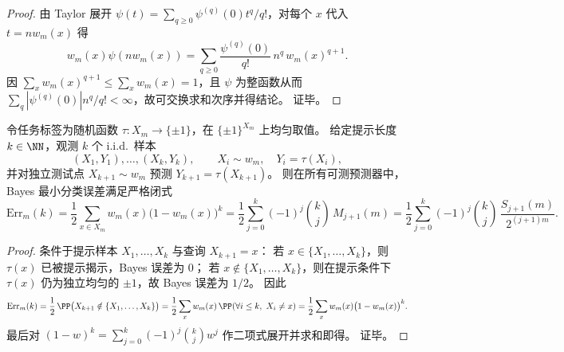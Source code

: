 \begin{proof}
由 Taylor 展开 \(\psi(t)=\sum_{q\ge 0}\psi^{(q)}(0)t^q/q!\)，对每个 \(x\) 代入 \(t=nw_m(x)\) 得
\[
w_m(x)\psi(nw_m(x))=\sum_{q\ge 0}\frac{\psi^{(q)}(0)}{q!}\,n^q\,w_m(x)^{q+1}.
\]
因 \(\sum_x w_m(x)^{q+1}\le \sum_x w_m(x)=1\)，且 \(\psi\) 为整函数从而 \(\sum_q|\psi^{(q)}(0)|n^q/q!<\infty\)，故可交换求和次序并得结论。
证毕。
\end{proof}

\begin{theorem}\label{thm:pom-random-fiber-task-bayes-error}
令任务标签为随机函数 \(\tau:X_m\to\{\pm1\}\)，在 \(\{\pm1\}^{X_m}\) 上均匀取值。
给定提示长度 \(k\in\NN\)，观测 \(k\) 个 i.i.d.\ 样本
\[
(X_1,Y_1),\dots,(X_k,Y_k),
\qquad
X_i\sim w_m,\quad Y_i=\tau(X_i),
\]
并对独立测试点 \(X_{k+1}\sim w_m\) 预测 \(Y_{k+1}=\tau(X_{k+1})\)。
则在所有可测预测器中，Bayes 最小分类误差满足严格闭式
\[
\mathrm{Err}_m(k)
=\frac12\sum_{x\in X_m}w_m(x)\bigl(1-w_m(x)\bigr)^k
=\frac12\sum_{j=0}^{k}(-1)^j\binom{k}{j}\,M_{j+1}(m)
=\frac12\sum_{j=0}^{k}(-1)^j\binom{k}{j}\,\frac{S_{j+1}(m)}{2^{(j+1)m}}.
\]
\end{theorem}

\begin{proof}
条件于提示样本 \(X_1,\dots,X_k\) 与查询 \(X_{k+1}=x\)：
若 \(x\in\{X_1,\dots,X_k\}\)，则 \(\tau(x)\) 已被提示揭示，Bayes 误差为 \(0\)；
若 \(x\notin\{X_1,\dots,X_k\}\)，则在提示条件下 \(\tau(x)\) 仍为独立均匀的 \(\pm1\)，故 Bayes 误差为 \(1/2\)。
因此
\[
\mathrm{Err}_m(k)=\frac12\,\PP\bigl(X_{k+1}\notin\{X_1,\dots,X_k\}\bigr)
=\frac12\sum_x w_m(x)\,\PP(\forall i\le k,\ X_i\neq x)
=\frac12\sum_x w_m(x)\bigl(1-w_m(x)\bigr)^k.
\]
最后对 \((1-w)^k=\sum_{j=0}^k(-1)^j\binom{k}{j}w^j\) 作二项式展开并求和即得。
证毕。
\end{proof}

